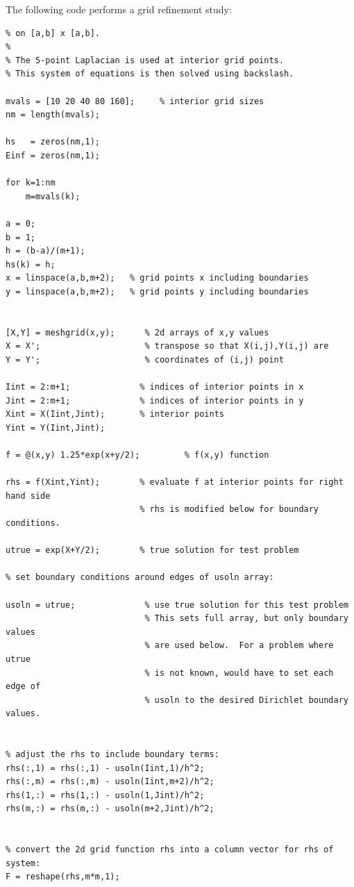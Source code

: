 \documentclass[11pt,twoside,openany]{memoir}
\begin{document}
\begin{solution}
The following code performs a grid refinement study:
\begin{lstlisting}[style=MatlabEditorGrey]
% poisson2.m  -- solve the Poisson problem u_{xx} + u_{yy} = f(x,y)
% on [a,b] x [a,b].  
% 
% The 5-point Laplacian is used at interior grid points.
% This system of equations is then solved using backslash.

mvals = [10 20 40 80 160];     % interior grid sizes
nm = length(mvals);

hs   = zeros(nm,1);
Einf = zeros(nm,1);

for k=1:nm
    m=mvals(k);

a = 0; 
b = 1; 
h = (b-a)/(m+1);
hs(k) = h;
x = linspace(a,b,m+2);   % grid points x including boundaries
y = linspace(a,b,m+2);   % grid points y including boundaries


[X,Y] = meshgrid(x,y);      % 2d arrays of x,y values
X = X';                     % transpose so that X(i,j),Y(i,j) are
Y = Y';                     % coordinates of (i,j) point

Iint = 2:m+1;              % indices of interior points in x
Jint = 2:m+1;              % indices of interior points in y
Xint = X(Iint,Jint);       % interior points
Yint = Y(Iint,Jint);

f = @(x,y) 1.25*exp(x+y/2);         % f(x,y) function

rhs = f(Xint,Yint);        % evaluate f at interior points for right hand side
                           % rhs is modified below for boundary conditions.

utrue = exp(X+Y/2);        % true solution for test problem

% set boundary conditions around edges of usoln array:

usoln = utrue;              % use true solution for this test problem
                            % This sets full array, but only boundary values
                            % are used below.  For a problem where utrue
                            % is not known, would have to set each edge of
                            % usoln to the desired Dirichlet boundary values.


% adjust the rhs to include boundary terms:
rhs(:,1) = rhs(:,1) - usoln(Iint,1)/h^2;
rhs(:,m) = rhs(:,m) - usoln(Iint,m+2)/h^2;
rhs(1,:) = rhs(1,:) - usoln(1,Jint)/h^2;
rhs(m,:) = rhs(m,:) - usoln(m+2,Jint)/h^2;


% convert the 2d grid function rhs into a column vector for rhs of system:
F = reshape(rhs,m*m,1);


\end{lstlisting}
\end{solution}
\end{document}
